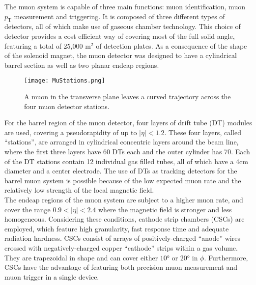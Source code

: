 The muon system is capable of three main functions: muon identification, muon $p_{\text{T}}$ measurement and triggering. It is composed of three different types of detectors, all of which make use of gaseous chamber technology. This choice of detector provides a cost efficient way of covering most of the full solid angle, featuring a total of 25,000 m$^2$ of detection plates. As a consequence of the shape of the solenoid magnet, the muon detector was designed to have a cylindrical barrel section as well as two planar endcap regions.\\

\begin{wrapfigure}{r}{5.5cm}
\caption{A muon in the transverse plane leaves a curved trajectory across the four muon detector stations\cite{MuDet}.}\label{MuStations}
\begin{center}
\vspace{-0.7cm}
\texttt{[image: MuStations.png]}
\end{center}
\end{wrapfigure}

For the barrel region of the muon detector, four layers of drift tube (DT) modules are used, covering a pseudorapidity of up to $|\eta| < 1.2$. These four layers, called ``stations'', are arranged in cylindrical concentric layers around the beam line, where the first three layers have 60 DTs each and the outer cylinder has 70. Each of the DT stations contain 12 individual gas filled tubes, all of which have a 4cm diameter and a center electrode. The use of DTs as tracking detectors for the barrel muon system is possible because of the low expected muon rate and the relatively low strength of the local magnetic field.\\
 
The endcap regions of the muon system are subject to a higher muon rate, and cover the range $0.9 < |\eta| < 2.4$ where the magnetic field is stronger and less homogeneous. Considering these conditions, cathode strip chambers (CSCs) are employed, which feature high granularity, fast response time and adequate radiation hardness. CSCs consist of arrays of positively-charged ``anode'' wires crossed with negatively-charged copper ``cathode'' strips within a gas volume. They are trapezoidal in shape and can cover either $\ang{10}$ or $\ang{20}$ in $\phi$. Furthermore, CSCs have the advantage of featuring both precision muon measurement and muon trigger in a single device.\\

